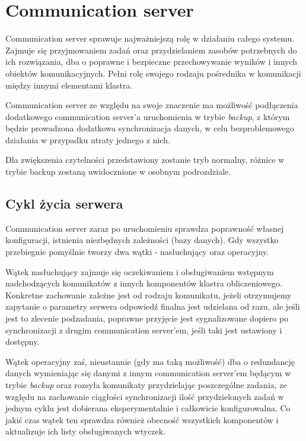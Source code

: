 \documentclass{report}
\begin{document}
\chapter{Communication server}
	
	Communication server sprawuje najważniejszą rolę w działaniu całego systemu. Zajmuje się
	przyjmowaniem zadań oraz przydzielaniem zasobów potrzebnych do ich rozwiązania,
	dba o poprawne i bezpieczne przechowywanie wyników i innych obiektów komunikacyjnych.
	Pełni rolę swojego rodzaju pośrednika w komunikacji między innymi elementami klastra.
	
	Communication server ze względu na swoje znaczenie ma możliwość podłączenia dodatkowego
	communication server'a uruchomienia w trybie \textit{backup}, z którym będzie
	prowadzona dodatkowa synchronizacja danych, w celu bezproblemowego działania
	w przypadku utraty jednego z nich.
	
	Dla zwiększenia czytelności przedstawiony zostanie tryb normalny, różnice w trybie
	backup zostaną uwidocznione w osobnym podrozdziale.
	
	
\section{Cykl życia serwera}
	Communication server zaraz po uruchomieniu sprawdza poprawność własnej konfiguracji,
	istnienia niezbędnych zależności (bazy danych). Gdy wszystko przebiegnie pomyślnie
	tworzy dwa wątki - nasłuchujący oraz operacyjny.
	
	Wątek nasłuchujący zajmuje się oczekiwaniem i obsługiwaniem wstępnym nadchodzących 
	komunikatów z innych komponentów klastra obliczeniowego. Konkretne zachowanie zależne
	jest od rodzaju komunikatu, jeżeli otrzymujemy zapytanie o parametry serwera
	odpowiedź finalna jest udzielana od razu, ale jeśli jest to zlecenie podzadania,
	poprawne przyjęcie jest sygnalizowane dopiero po synchronizacji z drugim communication server'em,
	jeśli taki jest ustawiony i dostępny.
	
	Wątek operacyjny zaś, nieustannie (gdy ma taką możliwość) dba o redundancję danych wymieniając 
	się danymi z innym communication server'em będącym w trybie \textit{backup} oraz rozsyła komunikaty 
	przydzielając poszczególne zadania,	ze względu na zachowanie ciągłości synchronizacji ilość 
	przydzielonych zadań w jednym cyklu jest dobierana eksperymentalnie i całkowicie konfigurowalna.
	Co jakiś czas wątek ten sprawdza również obecność wszystkich komponentów i aktualizuje ich listy
	obsługiwanych wtyczek. 
	
\end{document}
